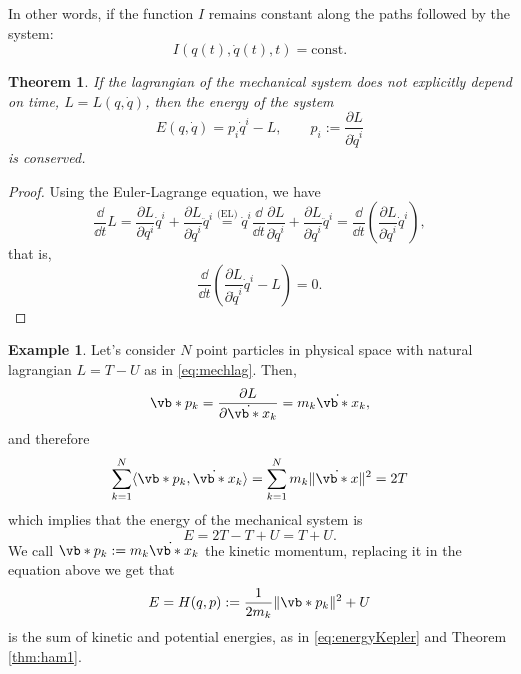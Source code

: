 \documentclass[english,fontsize=11pt,paper=b5]{scrbook}
\newtheorem{theorem}{Theorem}[chapter]
\theoremstyle{definition}
\newtheorem{example}{Example}[chapter]
\begin{document}
    In other words, if the function $I$ remains constant along the paths followed by the system:
    \begin{equation}
      I(q(t),\dot q(t), t) = \mathrm{const}.
    \end{equation}

    \begin{theorem}\label{thm:conservationEnergy}
      If the lagrangian of the mechanical system does not explicitly depend on time, $L = L(q, \dot q)$, then the \emph{energy} of the system
      \begin{equation}\label{eq:energy1}
        E(q,\dot q) = p_i \dot q^i - L,\qquad p_i := \frac{\partial L}{\partial \dot q^i}
      \end{equation}
      is conserved.
    \end{theorem}
    \begin{proof}
      Using the Euler-Lagrange equation, we have
      \begin{equation}
        \frac{\dd}{\dd t} L
        = \frac{\partial L}{\partial q^i} \dot q^i + \frac{\partial L}{\partial \dot q^i} \ddot q^i
        \overset{\text{(EL)}}{=} \dot q^i \frac{\dd}{\dd t} \frac{\partial L}{\partial \dot q^i} + \frac{\partial L}{\partial \dot q^i} \ddot q^i
        = \frac{\dd}{\dd t}\left(\frac{\partial L}{\partial \dot q^i} \dot q^i\right),
      \end{equation}
      that is,
      \begin{equation}
        \frac{\dd}{\dd t}\left(\frac{\partial L}{\partial \dot q^i} \dot q^i - L\right) = 0.
      \end{equation}
    \end{proof}

    \begin{example}\label{ex:natlagham}
      Let's consider $N$ point particles in physical space with natural lagrangian $L = T - U$ as in \eqref{eq:mechlag}.
      Then,
      \begin{equation}
        \vb*{p}_k = \frac{\partial L}{\partial \dot{\vb*{x}}_k} = m_k \dot{\vb*{x}}_k,
      \end{equation}
      and therefore
      \begin{equation}
        \sum_{k=1}^{N} \langle\vb*{p}_k, \dot{\vb*{x}}_k\rangle = \sum_{k=1}^{N} m_k \|\dot{\vb*{x}}\|^2 = 2 T
      \end{equation}
      which implies that the energy of the mechanical system is
      \begin{equation}\label{eq:energyFromL}
        E = 2T - T + U = T + U.
      \end{equation}
      We call $\vb*{p}_k := m_k \dot{\vb*{x}}_k$ the kinetic momentum, replacing it in the equation above we get that
      \begin{equation}
        E = H(q,p) := \frac{1}{2 m_k}\|\vb*{p}_k\|^2 + U
      \end{equation}
      is the sum of kinetic and potential energies, as in \eqref{eq:energyKepler} and Theorem \ref{thm:ham1}.
    \end{example}
\end{document}
